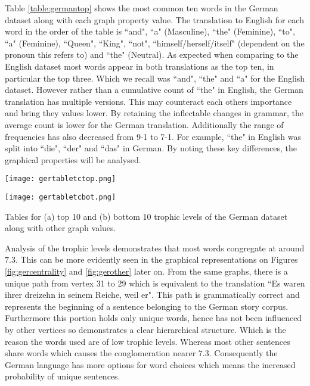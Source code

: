 Table \ref{table:germantop} shows the most common ten words in the German dataset along with each graph property value. The translation to English for each word in the order of the table is ``and", ``a" (Masculine), ``the" (Feminine), ``to", ``a" (Feminine), ``Queen", ``King", ``not", ``himself/herself/itself" (dependent on the pronoun this refers to) and ``the" (Neutral). As expected when comparing to the English dataset most words appear in both translations as the top ten, in particular the top three. Which we recall was ``and", ``the" and ``a" for the English dataset. However rather than a cumulative count of ``the" in English, the German translation has multiple versions. This may counteract each others importance and bring they values lower. By retaining the inflectable changes in grammar, the average count is lower for the German translation. Additionally the range of frequencies has also decreased from 9-1 to 7-1. For example, ``the" in English was split into ``die", ``der" and ``das" in German. By noting these key differences, the graphical properties will be analysed.

\begin{table}[!htb]
\centering
\begin{subtable}{.45\textwidth}
	\centering
	\texttt{[image: gertabletctop.png]}
	\caption{}
	\label{table:germantoptc}
\end{subtable}
\hfill
\begin{subtable}{.45\textwidth}
	\centering
	\texttt{[image: gertabletcbot.png]}
	\caption{}
	\label{table:germanbottc}
\end{subtable}
\caption{Tables for (a) top 10 and (b) bottom 10 trophic levels of the German dataset along with other graph values.}
\end{table}

Analysis of the trophic levels demonstrates that most words congregate at around $7.3$. This can be more evidently seen in the graphical representations on Figures \ref{fig:gercentrality} and \ref{fig:gerother} later on. From the same graphs, there is a unique path from vertex 31 to 29 which is equivalent to the translation ``Es waren ihrer dreizehn in seinem Reiche, weil er". This path is grammatically correct and represents the beginning of a sentence belonging to the German story corpus. Furthermore this portion holds only unique words, hence has not been influenced by other vertices so demonstrates a clear hierarchical structure. Which is the reason the words used are of low trophic levels. Whereas most other sentences share words which causes the conglomeration nearer $7.3$. Consequently the German language has more options for word choices which means the increased probability of unique sentences.

